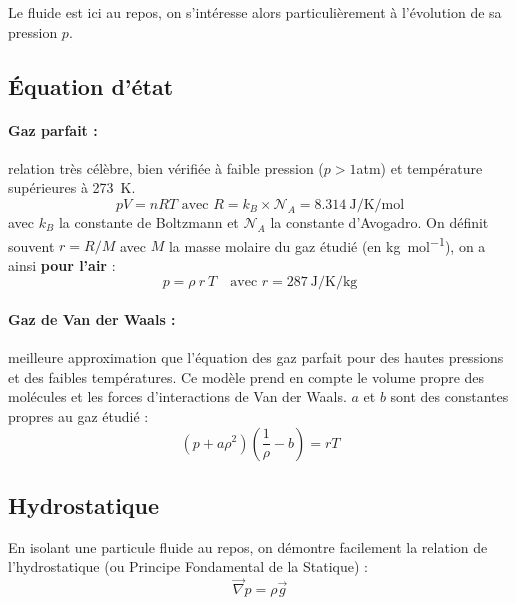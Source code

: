 
Le fluide est ici au repos, on s'intéresse alors particulièrement à l'évolution de sa pression $p$.


\subsection{Équation d'état}
\paragraph{Gaz parfait :}relation très célèbre, bien vérifiée à faible pression ($p>1$atm) et température supérieures à \SI{273}{\kelvin}.
%
\begin{equation}
    pV = nRT
    \text{ avec } R = k_B \times \mathcal{N}_A
    = \SI{8.314}{\joule\per\kelvin\per\mole}
\end{equation}
%
avec $k_B$ la constante de Boltzmann et $\mathcal{N}_A$ la constante d'Avogadro. On définit souvent $r = R/M$ avec $M$ la masse molaire du gaz étudié (en \si{\kg\per\mole}), on a ainsi \textbf{pour l'air} :
%
\begin{equation}
    p = \rho~r~T
    \quad\text{avec } r = \SI{287}{\joule\per\kelvin\per\kg}
\end{equation}

\paragraph{Gaz de Van der Waals :}meilleure approximation que l'équation des gaz parfait pour des hautes pressions et des faibles températures. Ce modèle prend en compte le volume propre des molécules et les forces d'interactions de Van der Waals. $a$ et $b$ sont des constantes propres au gaz étudié :
%
\begin{equation}
    \left( p + a\rho^2 \right) \left( \frac{1}{\rho} - b \right) = rT
\end{equation}


\subsection{Hydrostatique}
En isolant une particule fluide au repos, on démontre facilement la relation de l'hydrostatique (ou Principe Fondamental de la Statique) :
%
\begin{equation}
    \vec{\nabla} p = \rho \vec{g}
    \label{eq:PFS}
\end{equation}

